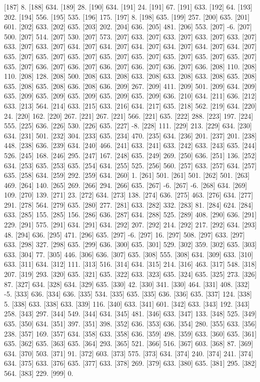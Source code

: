 [187]   8.
[188] 634.
[189]  28.
[190] 634.
[191]  24.
[191]  67.
[191] 633.
[192]  64.
[193] 202.
[194] 556.
[195] 535.
[196] 175.
[197]   8.
[198] 635.
[199] 257.
[200] 635.
[201] 601.
[202] 633.
[202] 635.
[203] 202.
[204] 636.
[205] 481.
[206] 553.
[207]  -6.
[207] 500.
[207] 514.
[207] 530.
[207] 573.
[207] 633.
[207] 633.
[207] 633.
[207] 633.
[207] 633.
[207] 633.
[207] 634.
[207] 634.
[207] 634.
[207] 634.
[207] 634.
[207] 634.
[207] 635.
[207] 635.
[207] 635.
[207] 635.
[207] 635.
[207] 635.
[207] 635.
[207] 635.
[207] 635.
[207] 636.
[207] 636.
[207] 636.
[207] 636.
[207] 636.
[207] 636.
[208] 110.
[208] 110.
[208] 128.
[208] 500.
[208] 633.
[208] 633.
[208] 633.
[208] 633.
[208] 635.
[208] 635.
[208] 635.
[208] 636.
[208] 636.
[209] 267.
[209] 411.
[209] 501.
[209] 634.
[209] 635.
[209] 635.
[209] 635.
[209] 635.
[209] 635.
[209] 636.
[210] 634.
[211] 636.
[212] 633.
[213] 564.
[214] 633.
[215] 633.
[216] 634.
[217] 635.
[218] 562.
[219] 634.
[220]  24.
[220] 162.
[220] 267.
[221] 267.
[221] 566.
[221] 635.
[222] 288.
[223] 197.
[224] 555.
[225] 636.
[226] 530.
[226] 635.
[227]  -8.
[228] 111.
[229] 213.
[229] 634.
[230] 634.
[231] 501.
[232] 304.
[233] 635.
[234] 470.
[235] 634.
[236] 201.
[237] 201.
[238] 448.
[238] 636.
[239] 634.
[240] 466.
[241] 633.
[241] 633.
[242] 633.
[243] 635.
[244] 526.
[245] 168.
[246] 295.
[247] 167.
[248] 635.
[249] 269.
[250] 636.
[251] 136.
[252] 634.
[253] 635.
[253] 635.
[254] 634.
[255] 525.
[256] 560.
[257] 633.
[257] 634.
[257] 635.
[258] 634.
[259] 292.
[259] 634.
[260]   1.
[261] 501.
[261] 501.
[262] 501.
[263] 469.
[264] 140.
[265] 269.
[266] 294.
[266] 635.
[267]  -6.
[267]  -6.
[268] 634.
[269] 109.
[270] 139.
[271]  23.
[272] 634.
[273] 138.
[274] 636.
[275] 463.
[276] 634.
[277] 291.
[278] 564.
[279] 635.
[280] 277.
[281] 633.
[282] 332.
[283]  81.
[284] 624.
[284] 633.
[285] 155.
[285] 156.
[286] 636.
[287] 634.
[288] 525.
[289] 408.
[290] 636.
[291] 229.
[291] 575.
[291] 634.
[291] 634.
[292] 207.
[292] 214.
[292] 217.
[292] 634.
[293]  48.
[294] 636.
[295] 471.
[296] 635.
[297]  -6.
[297]  16.
[297] 508.
[297] 633.
[297] 633.
[298] 327.
[298] 635.
[299] 636.
[300] 635.
[301] 529.
[302] 359.
[302] 635.
[303] 633.
[304]  77.
[305] 446.
[306] 636.
[307] 635.
[308] 555.
[308] 634.
[309] 633.
[310] 633.
[311] 634.
[312] 111.
[313] 516.
[314] 634.
[315] 214.
[316] 463.
[317] 548.
[318] 207.
[319] 293.
[320] 635.
[321] 635.
[322] 633.
[323] 635.
[324] 635.
[325] 273.
[326]  87.
[327] 634.
[328] 634.
[329] 635.
[330]  42.
[330] 341.
[330] 464.
[331] 408.
[332]  -5.
[333] 636.
[334] 636.
[335] 534.
[335] 635.
[335] 636.
[336] 635.
[337] 124.
[338]   5.
[338] 633.
[338] 633.
[339] 116.
[340] 633.
[341] 601.
[342] 633.
[343] 192.
[343] 258.
[343] 297.
[344] 549.
[344] 634.
[345] 481.
[346] 633.
[347] 133.
[348] 525.
[349] 635.
[350] 634.
[351] 397.
[351] 398.
[352] 636.
[353] 636.
[354] 280.
[355] 633.
[356] 238.
[357] 169.
[357] 634.
[358] 633.
[358] 636.
[359] 498.
[359] 633.
[360] 635.
[361] 635.
[362] 635.
[363] 635.
[364] 293.
[365] 521.
[366] 516.
[367] 603.
[368]  87.
[369] 634.
[370] 503.
[371]  91.
[372] 603.
[373] 575.
[373] 634.
[374] 240.
[374] 241.
[374] 634.
[375] 633.
[376] 635.
[377] 633.
[378] 269.
[379] 633.
[380] 635.
[381] 295.
[382] 564.
[383] 229.
[999]   0.
